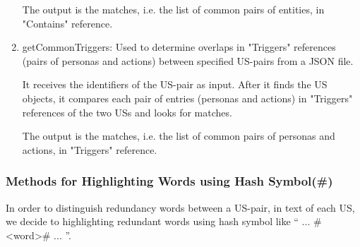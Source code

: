 \begin{enumerate}
The output is the matches, i.e. the list of common pairs of entities, in "Contains" reference.

\item getCommonTriggers: Used to determine overlaps in "Triggers" references (pairs of personas and actions) between specified US-pairs from a JSON file.

It receives the identifiers of the US-pair as input. After it finds the US objects, it compares each pair of entries (personas and actions) in "Triggers" references of the two USs and looks for matches.

The output is the matches, i.e. the list of common pairs of personas and actions, in "Triggers" reference.
\end{enumerate}
\subsubsection*{Methods for Highlighting Words using Hash Symbol(\#)}
In order to distinguish redundancy words between a US-pair, in text of each US, we decide to highlighting redundant words using hash symbol like \enquote{ ... \#\textless word\textgreater\# ... }.


